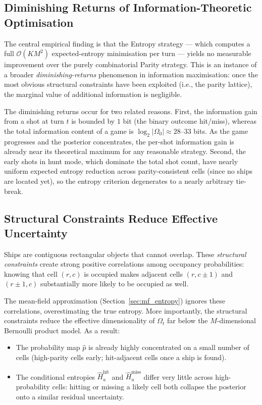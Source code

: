 \documentclass[12pt,a4paper]{article}
\newcommand{\1}{\mathbf{1}}
\newcommand{\bigo}{\mathcal{O}}
\begin{document}
\subsection{Diminishing Returns of Information-Theoretic Optimisation}

The central empirical finding is that the Entropy strategy --- which computes a
full $\bigo(KM^2)$ expected-entropy minimisation per turn --- yields no
measurable improvement over the purely combinatorial Parity strategy.  This is
an instance of a broader \emph{diminishing-returns} phenomenon in information
maximisation: once the most obvious structural constraints have been exploited
(i.e., the parity lattice), the marginal value of additional information is
negligible.

The diminishing returns occur for two related reasons.  First, the information
gain from a shot at turn $t$ is bounded by $1$ bit (the binary outcome
hit/miss), whereas the total information content of a game is
$\log_2|\Omega_0| \approx 28$--$33$ bits.  As the game progresses and the
posterior concentrates, the per-shot information gain is already near its
theoretical maximum for any reasonable strategy.  Second, the early shots in
hunt mode, which dominate the total shot count, have nearly uniform expected
entropy reduction across parity-consistent cells (since no ships are located
yet), so the entropy criterion degenerates to a nearly arbitrary tie-break.

\subsection{Structural Constraints Reduce Effective Uncertainty}

Ships are contiguous rectangular objects that cannot overlap.  These
\emph{structural constraints} create strong positive correlations among
occupancy probabilities: knowing that cell $(r, c)$ is occupied makes adjacent
cells $(r, c\pm 1)$ and $(r \pm 1, c)$ substantially more likely to be occupied
as well.

The mean-field approximation (Section~\ref{sec:mf_entropy}) ignores these
correlations, overestimating the true entropy.  More importantly, the structural
constraints reduce the effective dimensionality of $\Omega_t$ far below the
$M$-dimensional Bernoulli product model.  As a result:
\begin{itemize}[nosep]
  \item The probability map $\hat{p}$ is already highly concentrated on a small
        number of cells (high-parity cells early; hit-adjacent cells once a ship
        is found).
  \item The conditional entropies $\hat{H}^{\text{hit}}_a$ and
        $\hat{H}^{\text{miss}}_a$ differ very little across high-probability
        cells: hitting or missing a likely cell both collapse the posterior onto
        a similar residual uncertainty.
\end{itemize}
\end{document}
